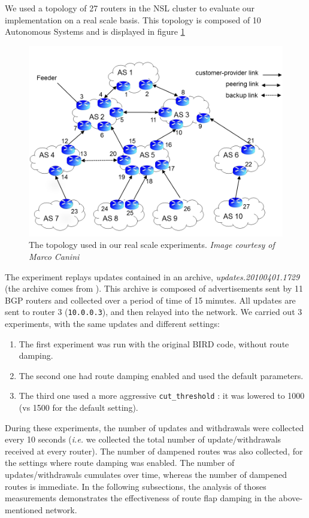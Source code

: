 \documentclass[a4paper,english]{IEEEtran}
\begin{document}
We used a topology of 27 routers in the NSL cluster to evaluate our implementation on a real scale basis.
This topology is composed of 10 Autonomous Systems and is displayed in figure \ref{fig_topo}
\begin{figure}
\begin{center}
\includegraphics[scale=.3]{img/topology.png}
\end{center}
\caption{The topology used in our real scale experiments. \textit{Image courtesy of Marco Canini}}
\label{fig_topo}
\end{figure}

The experiment replays updates contained in an archive,
\textsl{updates.20100401.1729} (the archive comes from \cite{routeviews}).
This archive is composed of advertisements sent by 11 BGP routers and collected
over a period of time of 15 minutes.
All updates are sent to router 3 (\texttt{\small 10.0.0.3}), and then relayed into the network.
We carried out 3 experiments, with the same updates and different settings:

\begin{enumerate}
\item The first experiment was run with the original BIRD code, without route damping.
\item The second one had route damping enabled and used the default parameters.
\item The third one used a more aggressive \texttt{\small cut\_threshold} : 
it was lowered to 1000 (vs 1500 for the default setting).
\end{enumerate}

During these experiments, the number of updates and withdrawals were collected every 10 seconds 
(\textit{i.e.} we collected the total number of update/withdrawals received at every router).
The number of dampened routes was also collected, for the settings where route damping was enabled.
The number of updates/withdrawals cumulates over time, whereas the number of dampened routes is immediate.
In the following subsections, the analysis of thoses measurements demonstrates the effectiveness
of route flap damping in the above-mentioned network.
\end{document}
